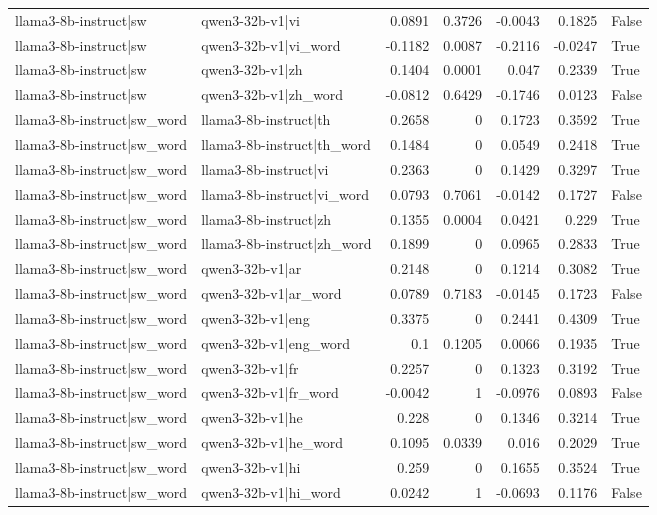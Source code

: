 \begin{table}
\begin{tabular}{l l r r r r l}
llama3-8b-instruct|sw & qwen3-32b-v1|vi & 0.0891 & 0.3726 & -0.0043 & 0.1825 & False \\
llama3-8b-instruct|sw & qwen3-32b-v1|vi_word & -0.1182 & 0.0087 & -0.2116 & -0.0247 & True \\
llama3-8b-instruct|sw & qwen3-32b-v1|zh & 0.1404 & 0.0001 & 0.047 & 0.2339 & True \\
llama3-8b-instruct|sw & qwen3-32b-v1|zh_word & -0.0812 & 0.6429 & -0.1746 & 0.0123 & False \\
llama3-8b-instruct|sw_word & llama3-8b-instruct|th & 0.2658 & 0 & 0.1723 & 0.3592 & True \\
llama3-8b-instruct|sw_word & llama3-8b-instruct|th_word & 0.1484 & 0 & 0.0549 & 0.2418 & True \\
llama3-8b-instruct|sw_word & llama3-8b-instruct|vi & 0.2363 & 0 & 0.1429 & 0.3297 & True \\
llama3-8b-instruct|sw_word & llama3-8b-instruct|vi_word & 0.0793 & 0.7061 & -0.0142 & 0.1727 & False \\
llama3-8b-instruct|sw_word & llama3-8b-instruct|zh & 0.1355 & 0.0004 & 0.0421 & 0.229 & True \\
llama3-8b-instruct|sw_word & llama3-8b-instruct|zh_word & 0.1899 & 0 & 0.0965 & 0.2833 & True \\
llama3-8b-instruct|sw_word & qwen3-32b-v1|ar & 0.2148 & 0 & 0.1214 & 0.3082 & True \\
llama3-8b-instruct|sw_word & qwen3-32b-v1|ar_word & 0.0789 & 0.7183 & -0.0145 & 0.1723 & False \\
llama3-8b-instruct|sw_word & qwen3-32b-v1|eng & 0.3375 & 0 & 0.2441 & 0.4309 & True \\
llama3-8b-instruct|sw_word & qwen3-32b-v1|eng_word & 0.1 & 0.1205 & 0.0066 & 0.1935 & True \\
llama3-8b-instruct|sw_word & qwen3-32b-v1|fr & 0.2257 & 0 & 0.1323 & 0.3192 & True \\
llama3-8b-instruct|sw_word & qwen3-32b-v1|fr_word & -0.0042 & 1 & -0.0976 & 0.0893 & False \\
llama3-8b-instruct|sw_word & qwen3-32b-v1|he & 0.228 & 0 & 0.1346 & 0.3214 & True \\
llama3-8b-instruct|sw_word & qwen3-32b-v1|he_word & 0.1095 & 0.0339 & 0.016 & 0.2029 & True \\
llama3-8b-instruct|sw_word & qwen3-32b-v1|hi & 0.259 & 0 & 0.1655 & 0.3524 & True \\
llama3-8b-instruct|sw_word & qwen3-32b-v1|hi_word & 0.0242 & 1 & -0.0693 & 0.1176 & False \\

\end{tabular}
\end{table}
